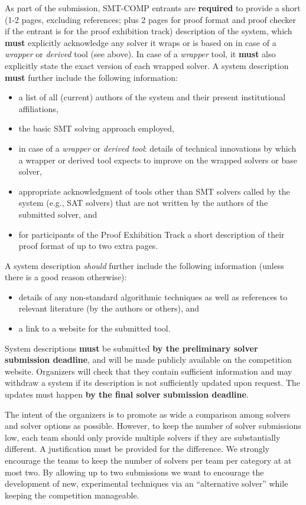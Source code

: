 \documentclass[12pt]{article}
\newcommand{\prooftrack}{Proof Exhibition Track\xspace}
\begin{document}
%
As part of the submission, SMT-COMP entrants are \textbf{required} to provide a
short (1-2 pages, excluding references; plus 2 pages for proof format and proof
checker if the entrant is for the proof exhibition track) description of the system, which \textbf{must} explicitly
acknowledge any solver it wraps or is based on in case of a \emph{wrapper} or
\emph{derived} tool (see above).
In case of a \emph{wrapper} tool, it \textbf{must} also explicitly state
the exact version of each wrapped solver.
A system description \textbf{must} further include the following information:
\begin{itemize}[itemsep=0ex]
  \item a list of all (current) authors of the system and their present institutional
    affiliations,
  \item the basic SMT solving approach employed,
  \item in case of a \emph{wrapper} or \emph{derived tool}: details of
    technical innovations by which a wrapper or derived tool expects to improve
    on the wrapped solvers or base solver,
  \item appropriate acknowledgment of tools other than SMT solvers called by
    the system (e.g., SAT solvers) that are not written by the authors of the
    submitted solver, and
  \item for participants of the \prooftrack{} a short description
    of their proof format of up to two extra pages.
\end{itemize}
A system description \emph{should} further include the following information
(unless there is a good reason otherwise):
\begin{itemize}[itemsep=0ex]
  \item details of any non-standard algorithmic techniques as well as
    references to relevant literature (by the authors or others), and
  \item a link to a website for the submitted tool.
\end{itemize}
System descriptions \textbf{must} be submitted \textbf{by the preliminary solver
submission deadline}, and will be made publicly available on the competition website.
Organizers will check that they contain sufficient information
and may withdraw a system if its description is not sufficiently updated upon
request. The updates must happen \textbf{by the final solver submission deadline}.

%
The intent of the organizers is to promote as wide a comparison among
solvers and solver options as possible.  However, to keep the number of
solver submissions low, each team should only provide multiple solvers
if they are  substantially different.  A justification must be provided
for the difference.  We strongly encourage the teams to keep the number
of solvers per team per category at at most two. By allowing
up to two submissions we want to encourage the development of new,
experimental techniques via an ``alternative solver'' while keeping
the competition manageable.
\end{document}
